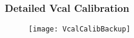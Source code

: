 \begin{frame}
	\frametitle{Detailed Vcal Calibration}
	\begin{figure} 
		\centering 
		\texttt{[image: VcalCalibBackup]}
	\end{figure}
\end{frame}